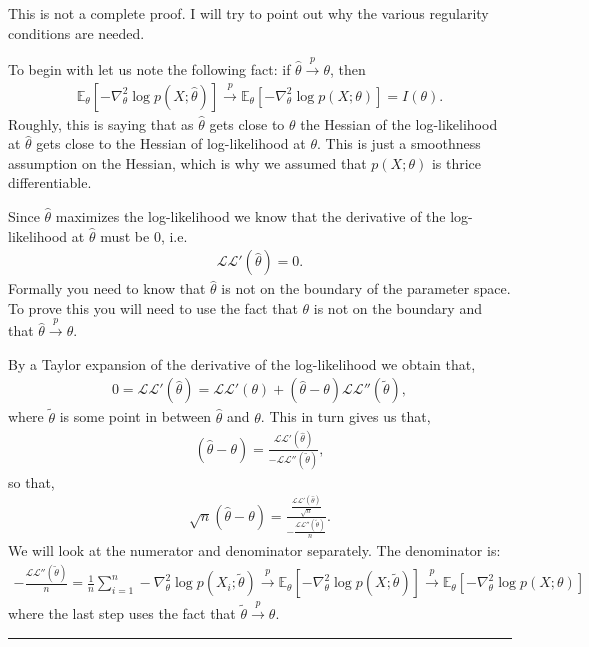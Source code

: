 \documentclass[twoside,12pt]{article}
\newenvironment{proof}{{\bf Proof:}}{\hfill\rule{2mm}{2mm}}
\newcommand{\cprob}{\overset{p}{\rightarrow}}
\begin{document}
\begin{proof}
This is not a complete proof. I will try to point out why the various regularity conditions are needed. 

To begin with let us note the following fact: if $\widehat{\theta} \cprob \theta$, then 
\begin{align*}
\mathbb{E}_{\theta}  [ - \nabla^2_{\theta}\log p(X; \widehat{\theta})] \cprob
\mathbb{E}_{\theta}  [ - \nabla^2_{\theta}\log p(X;\theta)] = I(\theta). 
\end{align*}
Roughly, this is saying that as $\widehat{\theta}$ gets close to $\theta$ the Hessian of the log-likelihood at $\widehat{\theta}$ gets close to the Hessian of log-likelihood at $\theta$. This is just a smoothness assumption on the Hessian, which is why we assumed that $p(X;\theta)$ is thrice differentiable.


Since $\widehat{\theta}$ maximizes the log-likelihood we know that the derivative of the log-likelihood at $\widehat{\theta}$ must be 0, i.e.
\begin{align*}
\mathcal{LL}'(\widehat{\theta}) = 0.
\end{align*}
Formally you need to know that $\widehat{\theta}$ is not on the boundary of the parameter space. To prove this you will need to use the fact that $\theta$ is not on the boundary and that $\widehat{\theta} \cprob \theta$.

By a Taylor expansion of the derivative of the log-likelihood we obtain that,
\begin{align*}
0 = \mathcal{LL}'(\widehat{\theta}) = \mathcal{LL}'(\theta) + (\widehat{\theta}- \theta)  \mathcal{LL}''(\widetilde{\theta}),
\end{align*}
where $\widetilde{\theta}$ is some point in between $\widehat{\theta}$ and $\theta$.
This in turn gives us that,
\begin{align*}
(\widehat{\theta}- \theta) = \frac{\mathcal{LL}'(\widehat{\theta})}{- \mathcal{LL}''(\widetilde{\theta})},
\end{align*}
so that,
\begin{align*}
\sqrt{n}(\widehat{\theta}- \theta) = \frac{\frac{\mathcal{LL}'(\widehat{\theta})}{\sqrt{n}}}{-\frac{ \mathcal{LL}''(\widetilde{\theta})}{n}}.
\end{align*}
We will look at the numerator and denominator separately.
The denominator is:
\begin{align*}
-\frac{ \mathcal{LL}''(\widetilde{\theta})}{n} = \frac{1}{n} \sum_{i=1}^n - \nabla^2_{\theta}\log p(X_i; \widetilde{\theta}) \cprob \mathbb{E}_{\theta} [ - \nabla^2_{\theta}\log p(X; \widetilde{\theta})] \cprob \mathbb{E}_{\theta} [ - \nabla^2_{\theta}\log p(X; \theta)] 
\end{align*}
where the last step uses the fact that $\widetilde{\theta} \cprob \theta$.


\end{proof}
\end{document}
